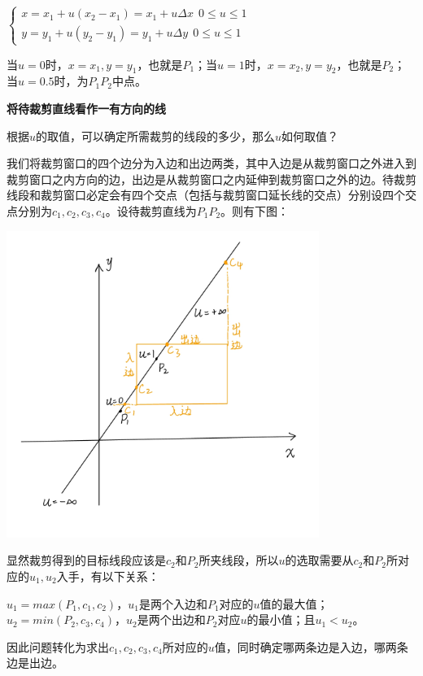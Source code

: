 \documentclass[a4paper,UTF8]{article}
\theoremstyle{definition}
\begin{document}
\begin{center}
	$
	\begin{cases}  
		x=x_1+u(x_2-x_1) = x_1 + u\Delta x\ \ 0\leq u\leq 1 \\
		y=y_1+u(y_2-y_1) = y_1 + u\Delta y\ \ 0\leq u\leq 1 
	\end{cases} 
	$
\end{center}

当$u=0$时，$x=x_1,y=y_1$，也就是$P_1$；当$u=1$时，$x=x_2,y=y_2$，也就是$P_2$；当$u=0.5$时，为$P_1P_2$中点。

\textbf{将待裁剪直线看作一有方向的线}

根据$u$的取值，可以确定所需裁剪的线段的多少，那么$u$如何取值？

我们将裁剪窗口的四个边分为入边和出边两类，其中入边是从裁剪窗口之外进入到裁剪窗口之内方向的边，出边是从裁剪窗口之内延伸到裁剪窗口之外的边。待裁剪线段和裁剪窗口必定会有四个交点（包括与裁剪窗口延长线的交点）分别设四个交点分别为$c_1,c_2,c_3,c_4$。设待裁剪直线为$P_1P_2$。则有下图：

\begin{center}
	\includegraphics[width=4in]{figs/3.png}
\end{center}

显然裁剪得到的目标线段应该是$c_2$和$P_2$所夹线段，所以$u$的选取需要从$c_2$和$P_2$所对应的$u_1,u_2$入手，有以下关系：

$u_1=max(P_1,c_1,c_2)$，$u_1$是两个入边和$P_1$对应的$u$值的最大值；$u_2=min(P_2,c_3,c_4)$，$u_2$是两个出边和$P_2$对应$u$的最小值；且$u_1<u_2$。

因此问题转化为求出$c_1,c_2,c_3,c_4$所对应的$u$值，同时确定哪两条边是入边，哪两条边是出边。
\end{document}
